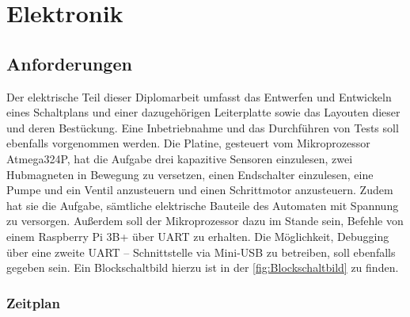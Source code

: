 \chapter{Elektronik}

\section{Anforderungen}

Der elektrische Teil dieser Diplomarbeit umfasst das Entwerfen und Entwickeln eines Schaltplans und einer dazugehörigen Leiterplatte sowie das Layouten dieser und deren Bestückung.
Eine Inbetriebnahme und das Durchführen von Tests soll ebenfalls vorgenommen werden.
Die Platine, gesteuert vom Mikroprozessor Atmega324P, hat die Aufgabe drei kapazitive Sensoren einzulesen, zwei Hubmagneten in Bewegung zu versetzen, einen Endschalter einzulesen, eine Pumpe und ein Ventil anzusteuern und einen Schrittmotor anzusteuern.
Zudem hat sie die Aufgabe, sämtliche elektrische Bauteile des Automaten mit Spannung zu versorgen.
Außerdem soll der Mikroprozessor dazu im Stande sein, Befehle von einem Raspberry Pi 3B+ über \acs{UART} zu erhalten.
Die Möglichkeit, Debugging über eine zweite UART – Schnittstelle via Mini-\acs{USB} zu betreiben, soll ebenfalls gegeben sein.
Ein Blockschaltbild hierzu ist in der \autoref{fig:Blockschaltbild} zu finden.

\subsection{Zeitplan}


